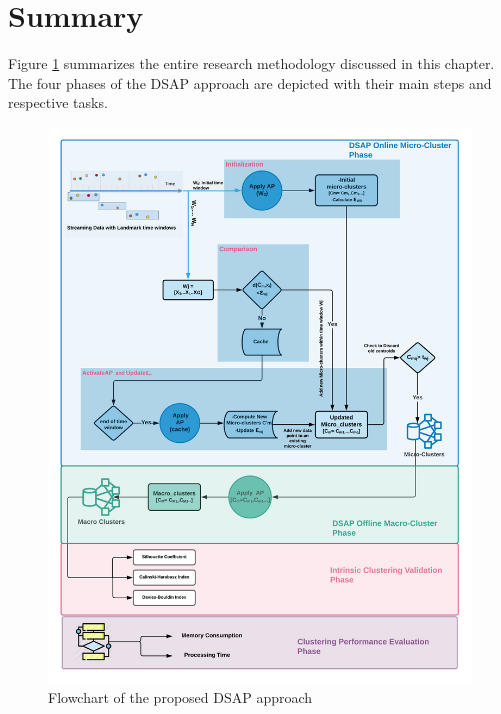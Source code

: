\section{Summary}

Figure \ref{frame} summarizes the entire research methodology discussed in this chapter. The four phases of the DSAP approach are depicted with their main steps and respective tasks. 




\begin{figure}[h]
\centering
\includegraphics[width =1.05\textwidth]{image/Chapters/Chapter4/dsapflowchart1.png} 
\caption{Flowchart of the proposed DSAP approach}
\label{frame}
\end{figure}


